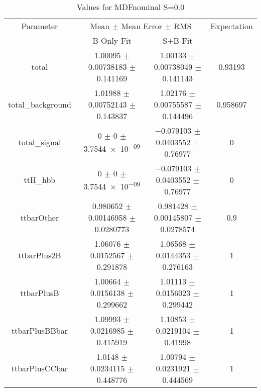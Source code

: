 \begin{table}
\centering
\caption{Values for MDFnominal S=0.0}
\begin{tabular}{cccc}
\toprule
Parameter & \multicolumn{2}{c}{Mean $\pm$ Mean Error $\pm$ RMS} & Expectation\\
 & B-Only Fit & S+B Fit & \\
\midrule
total & \num{1.00095} $\pm$ \num{0.00738183} $\pm$ \num{0.141169} & \num{1.00133} $\pm$ \num{0.00738049} $\pm$ \num{0.141143} & \num{0.93193}\\
total\_background & \num{1.01988} $\pm$ \num{0.00752143} $\pm$ \num{0.143837} & \num{1.02176} $\pm$ \num{0.00755587} $\pm$ \num{0.144496} & \num{0.958697}\\
total\_signal & \num{0} $\pm$ \num{0} $\pm$ \num{3.7544e-09} & \num{-0.079103} $\pm$ \num{0.0403552} $\pm$ \num{0.76977} & \num{0}\\
ttH\_hbb & \num{0} $\pm$ \num{0} $\pm$ \num{3.7544e-09} & \num{-0.079103} $\pm$ \num{0.0403552} $\pm$ \num{0.76977} & \num{0}\\
ttbarOther & \num{0.980652} $\pm$ \num{0.00146958} $\pm$ \num{0.0280773} & \num{0.981428} $\pm$ \num{0.00145807} $\pm$ \num{0.0278574} & \num{0.9}\\
ttbarPlus2B & \num{1.06076} $\pm$ \num{0.0152567} $\pm$ \num{0.291878} & \num{1.06568} $\pm$ \num{0.0144353} $\pm$ \num{0.276163} & \num{1}\\
ttbarPlusB & \num{1.00664} $\pm$ \num{0.0156138} $\pm$ \num{0.299662} & \num{1.01113} $\pm$ \num{0.0156023} $\pm$ \num{0.299442} & \num{1}\\
ttbarPlusBBbar & \num{1.09993} $\pm$ \num{0.0216985} $\pm$ \num{0.415919} & \num{1.10853} $\pm$ \num{0.0219104} $\pm$ \num{0.41998} & \num{1}\\
ttbarPlusCCbar & \num{1.0148} $\pm$ \num{0.0234115} $\pm$ \num{0.448776} & \num{1.00794} $\pm$ \num{0.0231921} $\pm$ \num{0.444569} & \num{1}\\
\bottomrule
\end{tabular}
\end{table}